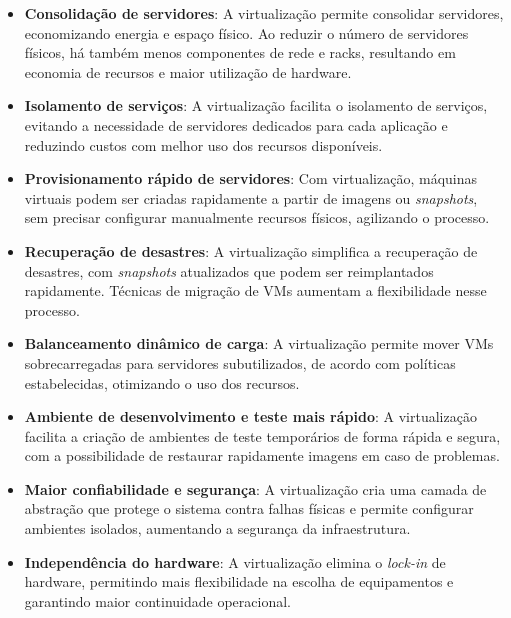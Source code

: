 \begin{itemize}
  \item \textbf{Consolidação de servidores}: A virtualização permite consolidar servidores, economizando energia e espaço físico. Ao reduzir o número de servidores físicos, há também menos componentes de rede e racks, resultando em economia de recursos e maior utilização de hardware.

  \item \textbf{Isolamento de serviços}: A virtualização facilita o isolamento de serviços, evitando a necessidade de servidores dedicados para cada aplicação e reduzindo custos com melhor uso dos recursos disponíveis.

  \item \textbf{Provisionamento rápido de servidores}: Com virtualização, máquinas virtuais podem ser criadas rapidamente a partir de imagens ou \textit{snapshots}, sem precisar configurar manualmente recursos físicos, agilizando o processo.

  \item \textbf{Recuperação de desastres}: A virtualização simplifica a recuperação de desastres, com \textit{snapshots} atualizados que podem ser reimplantados rapidamente. Técnicas de migração de VMs aumentam a flexibilidade nesse processo.

  \item \textbf{Balanceamento dinâmico de carga}: A virtualização permite mover VMs sobrecarregadas para servidores subutilizados, de acordo com políticas estabelecidas, otimizando o uso dos recursos.

  \item \textbf{Ambiente de desenvolvimento e teste mais rápido}: A virtualização facilita a criação de ambientes de teste temporários de forma rápida e segura, com a possibilidade de restaurar rapidamente imagens em caso de problemas.

  \item \textbf{Maior confiabilidade e segurança}: A virtualização cria uma camada de abstração que protege o sistema contra falhas físicas e permite configurar ambientes isolados, aumentando a segurança da infraestrutura.

  \item \textbf{Independência do hardware}: A virtualização elimina o \textit{lock-in} de hardware, permitindo mais flexibilidade na escolha de equipamentos e garantindo maior continuidade operacional.
\end{itemize}


